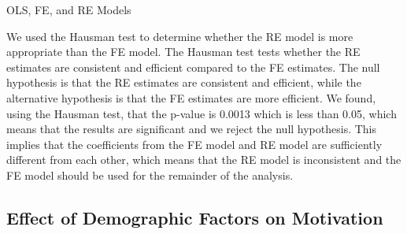 \documentclass[
  letterpaper,
  number,
  review,
  3p]{elsarticle}
\begin{document}
\begin{table}

\caption{\label{tbl-olsfere}OLS, FE, and RE Models}


\end{table}%

\clearpage

We used the Hausman test to determine whether the RE model is more
appropriate than the FE model. The Hausman test tests whether the RE
estimates are consistent and efficient compared to the FE estimates. The
null hypothesis is that the RE estimates are consistent and efficient,
while the alternative hypothesis is that the FE estimates are more
efficient. We found, using the Hausman test, that the p-value is 0.0013
which is less than 0.05, which means that the results are significant
and we reject the null hypothesis. This implies that the coefficients
from the FE model and RE model are sufficiently different from each
other, which means that the RE model is inconsistent and the FE model
should be used for the remainder of the analysis.

\subsection{Effect of Demographic Factors on
Motivation}\label{effect-of-demographic-factors-on-motivation}
\end{document}
